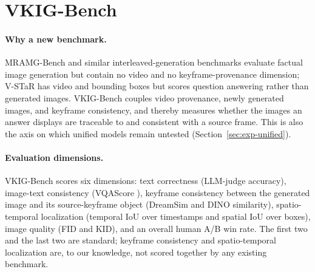 
\section{VKIG-Bench}\label{sec:bench}

\paragraph{Why a new benchmark.}
MRAMG-Bench \citep{mramgbench2502} and similar interleaved-generation benchmarks evaluate factual image generation but contain no video and no keyframe-provenance dimension; V-STaR \citep{vstar2503} has video and bounding boxes but scores question answering rather than generated images. VKIG-Bench couples video provenance, newly generated images, and keyframe consistency, and thereby measures whether the images an answer displays are traceable to and consistent with a source frame. This is also the axis on which unified models \citep{bagel2505,showo22506} remain untested (Section~\ref{sec:exp-unified}).

\paragraph{Evaluation dimensions.}
VKIG-Bench scores six dimensions: text correctness (LLM-judge accuracy), image-text consistency (VQAScore \citep{vqascore}), keyframe consistency between the generated image and its source-keyframe object (DreamSim and DINO similarity), spatio-temporal localization (temporal IoU over timestamps and spatial IoU over boxes), image quality (FID and KID), and an overall human A/B win rate. The first two and the last two are standard; keyframe consistency and spatio-temporal localization are, to our knowledge, not scored together by any existing benchmark.

